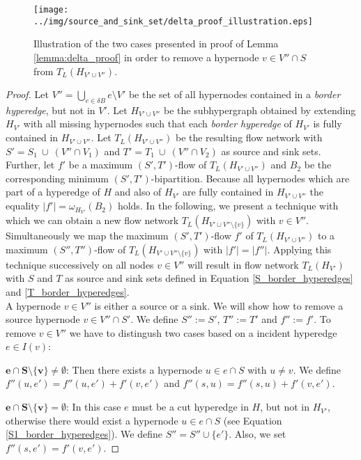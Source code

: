 \begin{figure}
\centering
\texttt{[image: ../img/source\_and\_sink\_set/delta\_proof\_illustration.eps]}
\caption{Illustration of the two cases presented in proof of Lemma \ref{lemma:delta_proof} in
         order to remove a hypernode $v \in V'' \cap S$ from $T_L(H_{V' \cup V''})$. }
\label{img:delta_proof_illustration}
\end{figure}

\begin{proof}
Let $V'' = \bigcup_{e \in \delta B} e \setminus V'$ be the set of all hypernodes contained
in a \emph{border hyperedge}, but not in $V'$. Let $H_{V' \cup V''}$ be the subhypergraph
obtained by extending $H_{V'}$ with all missing hypernodes such that 
each \emph{border hyperedge} of $H_{V'}$ is fully contained in $H_{V'\cup V''}$. 
Let $T_L(H_{V' \cup V''})$ be the resulting flow network with $S' = S_1\ \cup\ (V'' \cap V_1)$ and 
$T' = T_1\ \cup\ (V'' \cap V_2)$ as source and sink sets. Further, let $f'$ be a maximum $(S',T')$-flow 
of $T_L(H_{V' \cup V''})$ and $B_2$ be the corresponding minimum $(S',T')$-bipartition. Because
all hypernodes which are part of a hyperedge of $H$ and also of $H_{V'}$ are fully contained
in $H_{V' \cup V''}$ the equality $|f'| = \omega_{H_{V'}}(B_2)$ holds. In the following, we 
present a technique with which we can obtain a new flow network $T_L(H_{V' \cup V''\setminus \{v\}})$
with $v \in V''$. Simultaneously we map
the maximum $(S',T')$-flow $f'$ of $T_L(H_{V' \cup V''})$ to a maximum $(S'',T'')$-flow
of $T_L(H_{V' \cup V''\setminus \{v\}})$ with $|f'| = |f''|$. Applying this technique successively
on all nodes $v \in V''$ will result in flow network $T_L(H_{V'})$ with $S$ and $T$ as source and sink sets
defined in Equation \ref{S_border_hyperedges} and \ref{T_border_hyperedges}. \\
A hypernode $v \in V''$ is either a source or a sink. We will show how to remove a source
hypernode $v \in V'' \cap S'$. We define $S'' := S'$, $T'' := T'$ and 
$f'' := f'$. To remove $v \in V''$ we have to distingush two cases 
based on a incident hyperedge $e \in I(v)$: 

$\mathbf{e \cap S \setminus \{v\} \neq \emptyset}$:
Then there exists a hypernode $u \in e \cap S$ with $u \neq v$. We define
$f''(u,e') = f''(u,e') + f'(v,e')$ and $f''(s,u) = f''(s,u) + f'(v,e')$. 

$\mathbf{e \cap S \setminus \{v\} = \emptyset}$:
In this case $e$ must be a cut hyperedge in $H$, but not in $H_{V'}$, otherwise
there would exist a hypernode $u \in e \cap S$ (see Equation \ref{S1_border_hyperedges}).
We define $S'' = S'' \cup \{e'\}$. Also, we set $f''(s,e') = f'(v,e')$. 


\end{proof}
